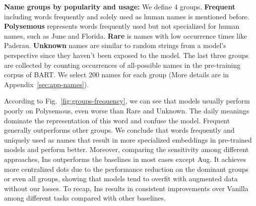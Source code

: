 

\textbf{Name groups by popularity and usage:} We define 4 groups. \textbf{Frequent} including words frequently and solely used as human names is mentioned before. \textbf{Polysemous} represents words frequently used but not specialized for human names, such as June and Florida. \textbf{Rare} is names with low occurrence times like Paderau. \textbf{Unknown} names are similar to random strings from a model's perspective since they haven't been exposed to the model. The last three groups are collected by counting occurrences
of all-possible names in the pre-training corpus of BART. We select 200 names for each group (More details are in Appendix~\ref{sec:app-names}).

According to Fig.~\ref{fig:groups-frequency}, we can see that models usually perform poorly on Polysemous, %
even worse than Rare and Unknown.  The daily meanings dominate the representation of this word and confuse the model. 
Frequent generally outperforms other groups.
We conclude that 
words frequently and uniquely used as names that result in more specialized embeddings in pre-trained models and perform better. 
Moreover, comparing the sensitivity among different approaches, Ins outperforms the baselines in most cases except Aug. It achieves more centralized dots due to the performance reduction on the dominant groups or even all groups, showing that models tend to overfit with augmented data without our losses.
To recap, Ins results in consistent improvements over Vanilla among different tasks compared with other baselines.




